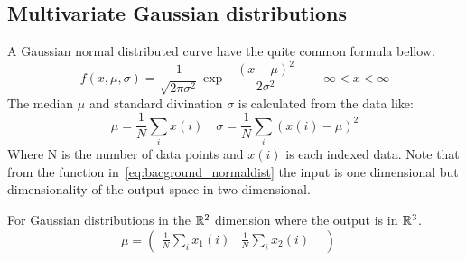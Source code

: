 \subsection{Multivariate Gaussian distributions}%
\label{sub:Multivariate_Gaussian_distributions}
A Gaussian normal distributed curve have the quite common formula bellow:
\begin{equation}\label{eq:bacground_normaldist}
    f(x,\mu, \sigma) = \frac{1}{\sqrt{2\pi \sigma^2}}\exp{-\frac{(x-\mu)^2}{2\sigma^2}}\quad -\infty < x < \infty
\end{equation}
The median $\mu$ and standard divination $\sigma$ is calculated from the data like:
\begin{equation}
    \mu = \frac{1}{N}\sum_i{x(i)}\quad \sigma = \frac{1}{N}\sum_i{(x(i)-\mu)^2}
\end{equation}
Where N is the number of data points and $x(i)$ is each indexed data.
Note that from the function in~\ref{eq:bacground_normaldist} the input is one dimensional but dimensionality of the output space in two dimensional.
\par For Gaussian distributions in the $\mathbb{R}^2$ dimension where the output is in $\mathbb{R}^3$.
\begin{equation}
    \mu = \begin{pmatrix}
        \frac{1}{N}\sum_i{x_1(i)} &
        \frac{1}{N}\sum_i{x_2(i)} &
    \end{pmatrix}
    \quad
\end{equation}

